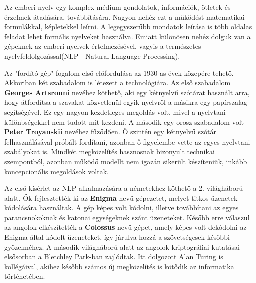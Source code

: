 

Az emberi nyelv egy komplex médium gondolatok, információk, ötletek és érzelmek átadására, továbbítására. Nagyon nehéz ezt a működést matematikai formulákkal, képletekkel leírni. A legegyszerűbb mondatok leírása is több oldalas feladat lehet formális nyelveket használva. Emiatt különösen nehéz dolguk van a gépeknek az emberi nyelvek értelmezésével, vagyis a természetes nyelvfeldolgozással(NLP - Natural Language Processing).

Az "fordító gép" fogalom első előfordulása az 1930-as évek közepére tehető. Akkoriban két szabadalom is létezett a technológiára. Az első szabadalom \textbf{Georges Artsrouni} nevéhez köthető, aki egy kétnyelvű szótárat használt arra, hogy átfordítsa a szavakat közvetlenül egyik nyelvről a másikra egy papírszalag segítségével. Ez egy nagyon kezdetleges megoldás volt, mivel a nyelvtani különbségekkel nem tudott mit kezdeni. A második egy orosz szabadalom volt \textbf{Peter Troyanskii} nevéhez fűződően. Ő szintén egy kétnyelvű szótár felhasználásával próbált fordítani, azonban ő figyelembe vette az egyes nyelvtani szabályokat is. Mindkét megközelítés hasznosnak bizonyult technikai szempontból, azonban működő modellt nem igazán sikerült készíteniük, inkább koncepcionális megoldások voltak.\cite{history}

Az első kísérlet az NLP alkalmazására a németekhez köthető a 2. világháború alatt. Ők fejlesztették ki az \textbf{Enigma} nevű gépezetet, melyet titkos üzenetek kódolására használtak. A gép képes volt kódolni, illetve továbbítani az egyes parancsnokoknak és katonai egységeknek szánt üzeneteket. Később erre válaszul az angolok elkészítették a \textbf{Colossus} nevű gépet, amely képes volt dekódolni az Enigma által kódolt üzeneteket, így járulva hozzá a szövetségesek későbbi győzelméhez.
A második világháború alatt az angolok kriptográfiai kutatásai elsősorban a Bletchley Park-ban zajlódtak. Itt dolgozott Alan Turing is kollégáival, akihez később számos új megközelítés is kötődik az informatika történetében.\cite{history}

